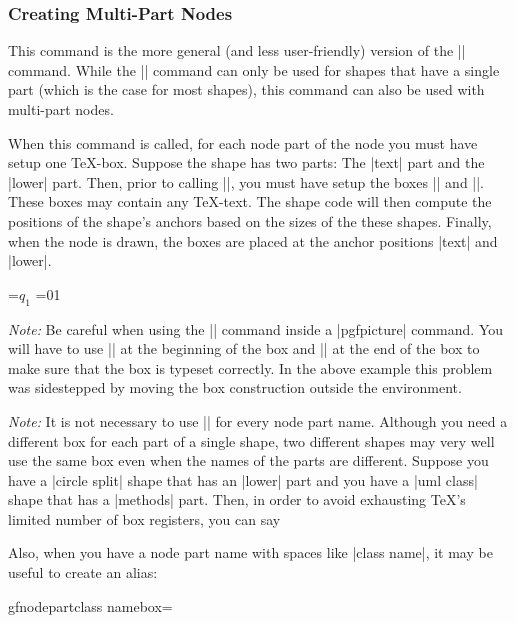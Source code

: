 \subsubsection{Creating Multi-Part Nodes}

\begin{command}{\pgfmultipartnode{}}
  This command is the more general (and less user-friendly) version of
  the |\pgfnode| command. While the |\pgfnode| command can only be
  used for shapes that have a single part (which is the case for most
  shapes), this command can also be used with multi-part nodes.

  When this command is called, for each node part of the node you must
  have setup one \TeX-box. Suppose the shape has two parts: The |text|
  part and the |lower| part. Then, prior to calling
  |\pgfmultipartnode|, you must have setup the boxes
  |\pgfnodeparttextbox| and |\pgfnodepartlowerbox|. These boxes may 
  contain any \TeX-text. The shape code will then compute the
  positions of the shape's anchors based on the sizes of the these
  shapes. Finally, when the node is drawn, the boxes are placed at the
  anchor positions |text| and |lower|.

\begin{codeexample}[]
\setbox\pgfnodeparttextbox=\hbox{$q_1$}
\setbox\pgfnodepartlowerbox=\hbox{01}
\begin{pgfpicture}
\end{pgfpicture}
\end{codeexample}

  \emph{Note:\/} Be careful when using the |\setbox| command inside a
  |{pgfpicture}| command. You will have to use |\pgfinterruptpath| at
  the beginning of the box and |\endpgfinterruptpath| at the end of
  the box to make sure that the box is typeset correctly. In the above
  example this problem was sidestepped by moving the box construction
  outside the environment.

  \emph{Note:\/} It is not necessary to use |\newbox| for every node
  part name. Although you need a different box for each part of a
  single shape, two different shapes may very well use the same box
  even when the names of the parts are different. Suppose you have a
  |circle split| shape that has an |lower| part and you have a
  |uml class| shape that has a |methods| part. Then, in order to avoid
  exhausting \TeX's limited number of box registers, you can say
\begin{codeexample}
\newbox\pgfnodepartlowerbox
\let\pgfnodepartmethodsbox=\pgfnodepartlowerbox  
\end{codeexample}
  Also, when you have a node part name with spaces like |class name|,
  it may be useful to create an alias:
\begin{codeexample}
\newbox\mybox
\expandafter\let\csname pgfnodepartclass namebox\endcsname=\mybox
\end{codeexample}
\end{command}

